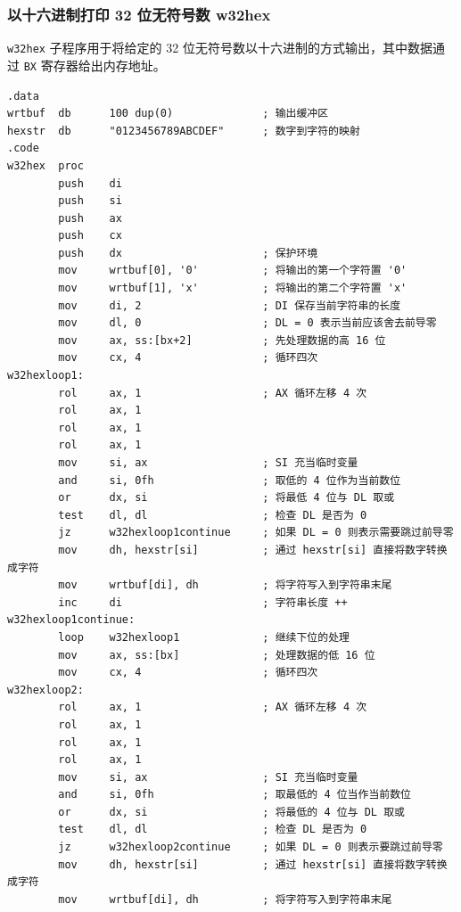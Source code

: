 \subsubsection{以十六进制打印 32 位无符号数 w32hex}

\verb|w32hex| 子程序用于将给定的 32 位无符号数以十六进制的方式输出，其中数据通过 \verb|BX| 寄存器给出内存地址。

\begin{lstlisting}[language={[x86masm]Assembler},morekeywords={}]
.data
wrtbuf  db      100 dup(0)              ; 输出缓冲区
hexstr  db      "0123456789ABCDEF"      ; 数字到字符的映射
.code
w32hex  proc
        push    di
        push    si
        push    ax
        push    cx
        push    dx                      ; 保护环境
        mov     wrtbuf[0], '0'          ; 将输出的第一个字符置 '0'
        mov     wrtbuf[1], 'x'          ; 将输出的第二个字符置 'x'
        mov     di, 2                   ; DI 保存当前字符串的长度
        mov     dl, 0                   ; DL = 0 表示当前应该舍去前导零
        mov     ax, ss:[bx+2]           ; 先处理数据的高 16 位
        mov     cx, 4                   ; 循环四次
w32hexloop1:
        rol     ax, 1                   ; AX 循环左移 4 次
        rol     ax, 1
        rol     ax, 1
        rol     ax, 1
        mov     si, ax                  ; SI 充当临时变量
        and     si, 0fh                 ; 取低的 4 位作为当前数位
        or      dx, si                  ; 将最低 4 位与 DL 取或
        test    dl, dl                  ; 检查 DL 是否为 0
        jz      w32hexloop1continue     ; 如果 DL = 0 则表示需要跳过前导零
        mov     dh, hexstr[si]          ; 通过 hexstr[si] 直接将数字转换成字符
        mov     wrtbuf[di], dh          ; 将字符写入到字符串末尾
        inc     di                      ; 字符串长度 ++
w32hexloop1continue:
        loop    w32hexloop1             ; 继续下位的处理
        mov     ax, ss:[bx]             ; 处理数据的低 16 位
        mov     cx, 4                   ; 循环四次
w32hexloop2:
        rol     ax, 1                   ; AX 循环左移 4 次
        rol     ax, 1
        rol     ax, 1
        rol     ax, 1
        mov     si, ax                  ; SI 充当临时变量
        and     si, 0fh                 ; 取最低的 4 位当作当前数位
        or      dx, si                  ; 将最低的 4 位与 DL 取或
        test    dl, dl                  ; 检查 DL 是否为 0
        jz      w32hexloop2continue     ; 如果 DL = 0 则表示要跳过前导零
        mov     dh, hexstr[si]          ; 通过 hexstr[si] 直接将数字转换成字符
        mov     wrtbuf[di], dh          ; 将字符写入到字符串末尾

\end{lstlisting}
